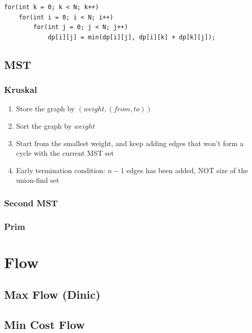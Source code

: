 \documentclass[10pt,oneside]{article}
\begin{document}
\begin{landscape}
\begin{multicols}{2}
\begin{verbatim}
for(int k = 0; k < N; k++)
    for(int i = 0; i < N; i++)
        for(int j = 0; j < N; j++)
            dp[i][j] = min(dp[i][j], dp[i][k] + dp[k][j]);
\end{verbatim}

\subsection{MST}

\subsubsection{Kruskal}

{\normalsize 
\begin{enumerate}
	\item Store the graph by $(weight, (from , to))$
	\item Sort the graph by $weight$ 
	\item Start from the smallest weight, and keep adding edges that won't form a cycle with the current MST set
	\item Early termination condition: $n - 1$ edges has been added, NOT size of the union-find set
\end{enumerate}
}

\subsubsection{Second MST}

\subsubsection{Prim}

\section{Flow}

\subsection{Max Flow (Dinic)}

\subsection{Min Cost Flow}


\end{multicols}
\end{landscape}
\end{document}

